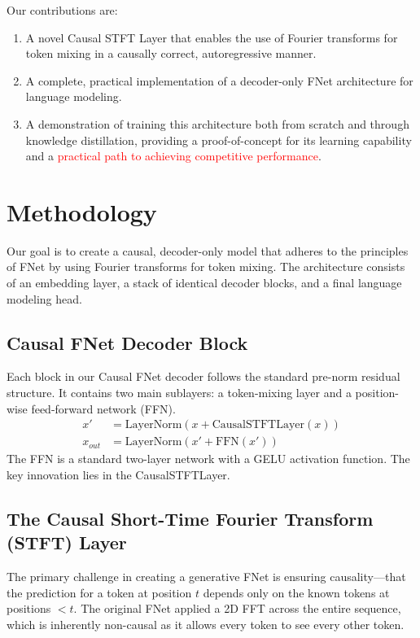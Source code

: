 \documentclass[11pt,a4paper]{article}
\begin{document}
Our contributions are:
\begin{enumerate}
\item A novel Causal STFT Layer that enables the use of Fourier transforms for token mixing in a causally correct, autoregressive manner.
\item A complete, practical implementation of a decoder-only FNet architecture for language modeling.
\item A demonstration of training this architecture both from scratch and through knowledge distillation, providing a proof-of-concept for its learning capability and a \textcolor{red}{practical path to achieving competitive performance}.
\end{enumerate}
\section{Methodology}
Our goal is to create a causal, decoder-only model that adheres to the principles of FNet by using Fourier transforms for token mixing. The architecture consists of an embedding layer, a stack of identical decoder blocks, and a final language modeling head.
\subsection{Causal FNet Decoder Block}
Each block in our Causal FNet decoder follows the standard pre-norm residual structure. It contains two main sublayers: a token-mixing layer and a position-wise feed-forward network (FFN).
\begin{align}
x' &= \text{LayerNorm}(x + \text{CausalSTFTLayer}(x)) \\
x_{out} &= \text{LayerNorm}(x' + \text{FFN}(x'))
\end{align}
The FFN is a standard two-layer network with a GELU activation function. The key innovation lies in the CausalSTFTLayer.
\subsection{The Causal Short-Time Fourier Transform (STFT) Layer}
The primary challenge in creating a generative FNet is ensuring causality—that the prediction for a token at position
$t$ depends only on the known tokens at positions $<t$. The original FNet applied a 2D FFT across the entire sequence, which is inherently non-causal as it allows every token to see every other token.
\end{document}
